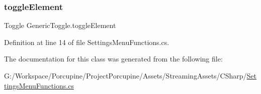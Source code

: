 \subsubsection{\texorpdfstring{toggle\+Element}{toggleElement}}
{\footnotesize\ttfamily Toggle Generic\+Toggle.\+toggle\+Element\hspace{0.3cm}{\ttfamily [protected]}}



Definition at line 14 of file Settings\+Menu\+Functions.\+cs.



The documentation for this class was generated from the following file\+:\begin{DoxyCompactItemize}
\item 
G\+:/\+Workspace/\+Porcupine/\+Project\+Porcupine/\+Assets/\+Streaming\+Assets/\+C\+Sharp/\hyperlink{_settings_menu_functions_8cs}{Settings\+Menu\+Functions.\+cs}\end{DoxyCompactItemize}
